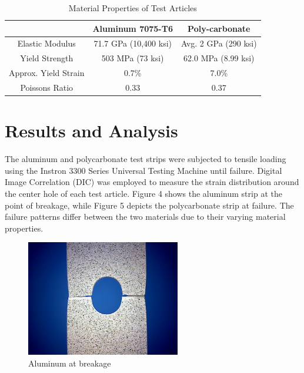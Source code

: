 \documentclass{article}
\begin{document}
\begin{table}[H]
    \centering
    \begin{tabular}{c c c}
        \hline
        \hline 
        
         & Aluminum 7075-T6 & Poly-carbonate  \\  
         
         \hline
         
        Elastic Modulus & 71.7 GPa (10,400 ksi) & Avg. 2 GPa (290 ksi) \\[2pt]
        Yield Strength & 503 MPa (73 ksi) & 62.0 MPa (8.99 ksi) \\[2pt]
        Approx. Yield Strain & 0.7\% & 7.0\% \\[2pt]
        Poissons Ratio & 0.33 & 0.37 \\[2pt]
        
        \hline
        \hline
    \end{tabular}
    \caption{Material Properties of Test Articles}
    \label{tab:materialproperties}
\end{table}


\section{Results and Analysis}


The aluminum and polycarbonate test strips were subjected to tensile loading using the Instron 3300 Series Universal Testing Machine until failure. Digital Image Correlation (DIC) was employed to measure the strain distribution around the center hole of each test article. Figure 4 shows the aluminum strip at the point of breakage, while Figure 5 depicts the polycarbonate strip at failure. The failure patterns differ between the two materials due to their varying material properties.

\begin{figure}[H]
    \centering
    \includegraphics[width = 0.6\textwidth]{lab9images/aluminum_break.jpg}
    \caption{Aluminum at breakage}
    \label{fig:alfail}
\end{figure}
\end{document}
